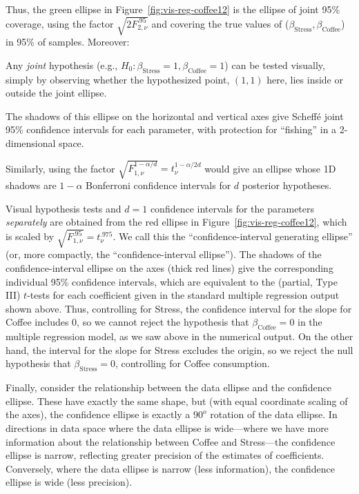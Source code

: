 \documentclass[11pt]{article}%
\newcommand*{\figref}[1]{Figure~\ref{#1}}
\begin{document}
Thus, the green ellipse in \figref{fig:vis-reg-coffee12} is the
ellipse of joint 95\% coverage, using the factor $\sqrt{2 F^{.95}_{2, \nu}}$
and covering the true values of ($\beta_{\mathrm{Stress}}, \beta_{\mathrm{Coffee}}$)
in 95\% of samples.  Moreover:
\begin{itemize*}
  \item Any \emph{joint} hypothesis (e.g., $H_0:\beta_{\mathrm{Stress}}=1, \beta_{\mathrm{Coffee}}=1$)
can be tested visually, simply by observing whether the
hypothesized point, $(1, 1)$ here, lies inside or outside the joint ellipse.
  \item The shadows of this ellipse on the horizontal and vertical axes
give Scheff\'e joint 95\%  confidence intervals for each parameter, with protection for ``fishing''
in a 2-dimensional space.
  \item Similarly, using the factor
$\sqrt{F^{1-\alpha/d}_{1, \nu}} = t^{1-\alpha/2d}_\nu$ would give an
ellipse whose 1D shadows are $1-\alpha$ Bonferroni confidence intervals
for $d$ posterior hypotheses.
\end{itemize*}

Visual hypothesis tests and $d=1$ confidence intervals for the parameters \emph{separately}
are obtained from the red ellipse in \figref{fig:vis-reg-coffee12},
which is scaled by $\sqrt{F^{.95}_{1, \nu}} = t^{.975}_\nu$. We call this the ``confidence-interval generating ellipse'' (or, more compactly, the ``confidence-interval ellipse'').
The shadows of the confidence-interval ellipse on the axes (thick red lines) give the
corresponding individual 95\% confidence intervals, which are
equivalent to the (partial, Type III) $t$-tests for each coefficient given in the
standard multiple regression output shown above.
Thus, controlling for Stress, the confidence interval for the slope for Coffee includes 0,
so we cannot reject the hypothesis that $\beta_{\mathrm{Coffee}}=0$
in the multiple regression model, as we saw above in the numerical output.
On the other hand, the interval for the slope for Stress excludes the origin,
so we reject the null hypothesis that $\beta_{\mathrm{Stress}}=0$,
controlling for Coffee consumption.

Finally, consider the relationship between the data ellipse and the
confidence ellipse.  These have exactly the same shape, but
(with equal coordinate scaling of the axes), the confidence ellipse
is exactly a $90^o$ rotation of the data ellipse.  In directions in
data space where the data ellipse is wide---where we have more information
about the relationship between Coffee and Stress---the confidence ellipse is
narrow, reflecting greater precision of the estimates of coefficients.
Conversely, where the data ellipse is narrow (less information), the
confidence ellipse is wide (less precision).
\end{document}
